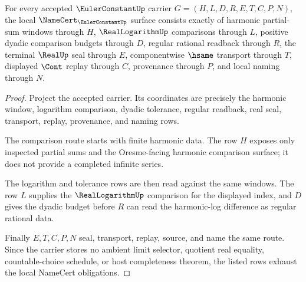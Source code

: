 \begin{theorem}
\label{thm:euler-constant-namecert-obligations}
For every accepted $\EulerConstantUp$ carrier $G=(H,L,D,R,E,T,C,P,N)$, the local $\NameCert_{\EulerConstantUp}$ surface consists exactly of harmonic partial-sum windows through $H$, $\RealLogarithmUp$ comparisons through $L$, positive dyadic comparison budgets through $D$, regular rational readback through $R$, the terminal $\RealUp$ seal through $E$, componentwise $\hsame$ transport through $T$, displayed $\Cont$ replay through $C$, provenance through $P$, and local naming through $N$.
\end{theorem}
\begin{proof}
Project the accepted carrier. Its coordinates are precisely the harmonic window, logarithm comparison, dyadic tolerance, regular readback, real seal, transport, replay, provenance, and naming rows.

The comparison route starts with finite harmonic data. The row $H$ exposes only inspected partial sums and the Oresme-facing harmonic comparison surface; it does not provide a completed infinite series.

The logarithm and tolerance rows are then read against the same windows. The row $L$ supplies the $\RealLogarithmUp$ comparison for the displayed index, and $D$ gives the dyadic budget before $R$ can read the harmonic-log difference as regular rational data.

Finally $E,T,C,P,N$ seal, transport, replay, source, and name the same route. Since the carrier stores no ambient limit selector, quotient real equality, countable-choice schedule, or host completeness theorem, the listed rows exhaust the local NameCert obligations.
\end{proof}

